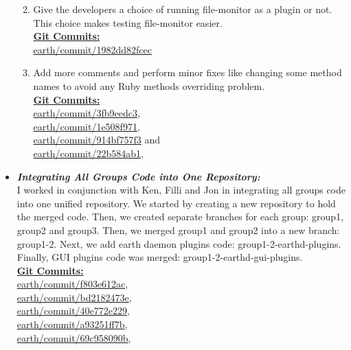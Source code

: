 \documentclass{article}
\begin{document}
\begin{itemize}
\begin{enumerate}
\newpage

\item Give the developers a choice of running file-monitor as a plugin or not. This choice makes testing file-monitor easier. \\
\underline{\textbf{Git Commits: }} \\
\href{http://github.com/Jonv/earth/commit/1982dd82fcec}{earth/commit/1982dd82fcec}

\item Add more comments and perform minor fixes like changing some method names to avoid any Ruby methods overriding problem.\\ 
\underline{\textbf{Git Commits: }} \\
\href{http://github.com/Jonv/earth/commit/3fb9eedc3}{earth/commit/3fb9eedc3},\\
\href{http://github.com/Jonv/earth/commit/1e508f971}{earth/commit/1e508f971},\\
\href{http://github.com/Jonv/earth/commit/914bf757f3}{earth/commit/914bf757f3} and\\
\href{http://github.com/Jonv/earth/commit/22b584ab1}{earth/commit/22b584ab1},\\
\end{enumerate}
	\item \textit{\textbf{Integrating All Groups Code into One Repository:}}\\
I worked in conjunction with Ken, Filli and Jon in integrating all groups code into one unified repository. We started by creating a new repository to hold the merged code. Then, we created separate branches for each group: group1, group2 and group3. Then, we merged group1 and group2 into a new branch: group1-2. Next, we add earth daemon plugins code: group1-2-earthd-plugins. Finally, GUI plugins code was merged: group1-2-earthd-gui-plugins.\\
\underline{\textbf{Git Commits: }} \\ 
\href{http://github.com/Jonv/earth/commit/f803e612ac}{earth/commit/f803e612ac},\\
\href{http://github.com/Jonv/earth/commit/bd2182473e}{earth/commit/bd2182473e},\\
\href{http://github.com/Jonv/earth/commit/40e772e229}{earth/commit/40e772e229},\\
\href{http://github.com/Jonv/earth/commit/a93251ff7b}{earth/commit/a93251ff7b},\\
\href{http://github.com/Jonv/earth/commit/69c958090b}{earth/commit/69c958090b},\\

\end{itemize}
\end{document}

